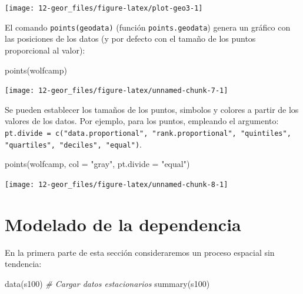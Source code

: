 \documentclass[
  spanish,
]{book}
\newenvironment{Shaded}{\begin{snugshade}}{\end{snugshade}}
\newcommand{\AttributeTok}[1]{\textcolor[rgb]{0.77,0.63,0.00}{#1}}
\newcommand{\CommentTok}[1]{\textcolor[rgb]{0.56,0.35,0.01}{\textit{#1}}}
\newcommand{\FunctionTok}[1]{\textcolor[rgb]{0.00,0.00,0.00}{#1}}
\newcommand{\NormalTok}[1]{#1}
\newcommand{\StringTok}[1]{\textcolor[rgb]{0.31,0.60,0.02}{#1}}
\theoremstyle{break}
\theoremstyle{definition}
\theoremstyle{definition}
\theoremstyle{definition}
\theoremstyle{definition}
\theoremstyle{remark}
\begin{document}
\begin{center}\texttt{[image: 12-geor\_files/figure-latex/plot-geo3-1]} \end{center}

El comando \texttt{points(geodata)} (función \texttt{points.geodata}) genera un gráfico con
las posiciones de los datos (y por defecto con el tamaño de los puntos proporcional
al valor):

\begin{Shaded}
\begin{Highlighting}[]
\FunctionTok{points}\NormalTok{(wolfcamp)}
\end{Highlighting}
\end{Shaded}

\begin{center}\texttt{[image: 12-geor\_files/figure-latex/unnamed-chunk-7-1]} \end{center}

Se pueden establecer los tamaños de los puntos, simbolos y colores a
partir de los valores de los datos. Por ejemplo, para los puntos, empleando el argumento:
\texttt{pt.divide\ =\ c("data.proportional",\ "rank.proportional",\ "quintiles",}
\texttt{"quartiles",\ "deciles",\ "equal")}.

\begin{Shaded}
\begin{Highlighting}[]
\FunctionTok{points}\NormalTok{(wolfcamp, }\AttributeTok{col =} \StringTok{"gray"}\NormalTok{, }\AttributeTok{pt.divide =} \StringTok{"equal"}\NormalTok{)}
\end{Highlighting}
\end{Shaded}

\begin{center}\texttt{[image: 12-geor\_files/figure-latex/unnamed-chunk-8-1]} \end{center}

\hypertarget{modelado-de-la-dependencia}{%
\section{Modelado de la dependencia}\label{modelado-de-la-dependencia}}

En la primera parte de esta sección consideraremos un proceso espacial sin
tendencia:

\begin{Shaded}
\begin{Highlighting}[]
\FunctionTok{data}\NormalTok{(s100) }\CommentTok{\# Cargar datos estacionarios}
\FunctionTok{summary}\NormalTok{(s100)}
\end{Highlighting}
\end{Shaded}
\end{document}
